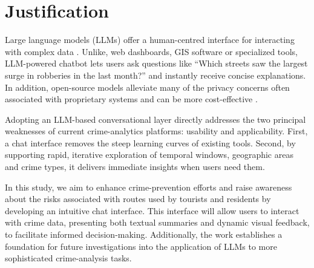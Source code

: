 \section{Justification}



Large language models (LLMs) offer a human-centred interface for interacting with complex data \cite{Yang2024HumanAIInteraction} \cite{Pappula2023LLMsFC}. Unlike, web dashboards, GIS software or specialized tools, LLM-powered chatbot lets users ask questions like ``Which streets saw the largest surge in robberies in the last month?'' and instantly receive concise explanations. In addition, open-source models alleviate many of the privacy concerns often associated with proprietary systems and can be more cost-effective \cite{Liu2024NLDriven}. 


Adopting an LLM-based conversational layer directly addresses the two principal weaknesses of current crime-analytics platforms: usability and applicability. First, a chat interface removes the steep learning curves of existing tools. Second, by supporting rapid, iterative exploration of temporal windows, geographic areas and crime types, it delivers immediate insights when users need them.

In this study, we aim to enhance crime-prevention efforts and raise awareness about the risks associated with routes used by tourists and residents by developing an intuitive chat interface. This interface will allow users to interact with crime data, presenting both textual summaries and dynamic visual feedback, to facilitate informed decision-making. Additionally, the work establishes a foundation for future investigations into the application of LLMs to more sophisticated crime-analysis tasks. %

